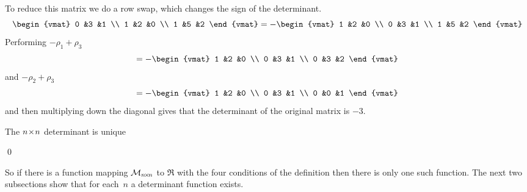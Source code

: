 \documentclass[10pt,t]{beamer}
\begin{document}
\begin{frame}
\ex
To reduce this matrix we do a row swap, 
which changes the sign of the determinant.
\begin{equation*}
  \begin{vmat}
    0  &3  &1 \\
    1  &2  &0 \\
    1  &5  &2
  \end{vmat}
  =
  -\begin{vmat}
    1  &2  &0 \\
    0  &3  &1 \\
    1  &5  &2
  \end{vmat}
\end{equation*}
Performing $-\rho_1+\rho_3$
\begin{equation*}
  =-\begin{vmat}
    1  &2  &0 \\
    0  &3  &1 \\
    0  &3  &2
  \end{vmat}
\end{equation*}
and $-\rho_2+\rho_3$
\begin{equation*}
  =-\begin{vmat}
    1  &2  &0 \\
    0  &3  &1 \\
    0  &0  &1
  \end{vmat}
\end{equation*}
and then multiplying down the diagonal gives that the determinant
of the original matrix is $-3$.
\end{frame}



\begin{frame}{The $n \! \times \! n$ determinant is unique}
\lm[lm:DetFcnIsUnique]

\pause 
\pf 
{}
\qed

\pause
\medskip
So if there is a function mapping $\mathcal{M}_{n \! \times \! n}$ to $\Re$ with 
the four conditions of the definition then there is only one such
function.
The next two subsections show that for each~$n$ a determinant function 
exists.
\end{frame}



\end{document}
